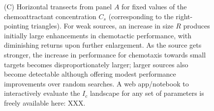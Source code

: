 \documentclass[9pt,twocolumn,twoside]{pnas-new}
\begin{document}
\begin{figure}
{        (C) Horizontal transects from panel $A$ for fixed values of the chemoattractant concentration $C_s$ (corresponding to the right-pointing triangles).
        For weak sources, an increase in size $R$ produces initially large enhancements in chemotactic performance, with diminishing returns upon further enlargement.
        As the source gets stronger, the increase in performance for chemotaxis towards small targets becomes disproportionately larger; larger sources also become detectable although offering modest performance improvements over random searches.
        {\color{magenta}A web app/notebook to interactively evaluate the $I_c$ landscape for any set of parameters is freely available here: XXX.}
    }
    \label{fig:asymmetric-performance}
\end{figure}
\end{document}
